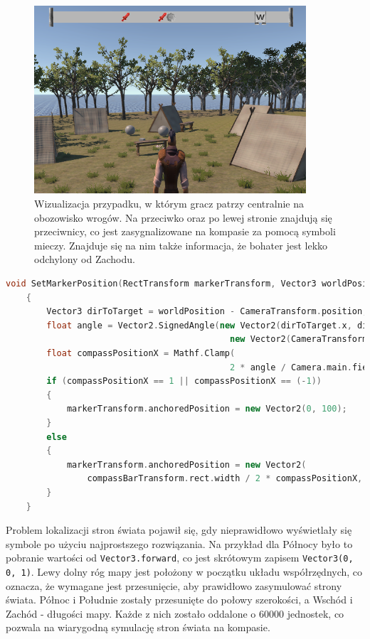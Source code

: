 \begin{figure}[htbp]
    \centering
    \includegraphics[width=0.9\textwidth]{images/ui/compass.png}
    \caption{Wizualizacja przypadku, w którym gracz patrzy centralnie na obozowisko wrogów. Na przeciwko oraz po lewej stronie znajdują się przeciwnicy, co jest zasygnalizowane na kompasie za pomocą symboli mieczy. Znajduje się na nim także informacja, że bohater jest lekko odchylony od Zachodu.
    }\label{fig:compass}
\end{figure}
\FloatBarrier
    \begin{lstlisting}[language=C++, caption=Fragment kodu odpowiedzialny za ustawienie symbolu na pasku kompasu.]
    void SetMarkerPosition(RectTransform markerTransform, Vector3 worldPosition)
    {
        Vector3 dirToTarget = worldPosition - CameraTransform.position;
        float angle = Vector2.SignedAngle(new Vector2(dirToTarget.x, dirToTarget.z), 
                                            new Vector2(CameraTransform.transform.forward.x, CameraTransform.transform.forward.z));
        float compassPositionX = Mathf.Clamp(
                                            2 * angle / Camera.main.fieldOfView, -1, 1);
        if (compassPositionX == 1 || compassPositionX == (-1))
        {
            markerTransform.anchoredPosition = new Vector2(0, 100);
        }
        else
        {
            markerTransform.anchoredPosition = new Vector2(
                compassBarTransform.rect.width / 2 * compassPositionX, 0);
        }
    }
    \end{lstlisting}
\FloatBarrier
Problem lokalizacji stron świata pojawił się, gdy nieprawidłowo wyświetlały się symbole po użyciu najprostszego rozwiązania. Na przykład dla Północy było to
pobranie wartości od \verb|Vector3.forward|, co jest skrótowym zapisem \verb|Vector3(0, 0, 1)|. Lewy dolny róg mapy jest położony w początku układu współrzędnych, co oznacza, że wymagane
jest przesunięcie, aby prawidłowo zasymulować strony świata. Północ i Południe  zostały przesunięte do połowy szerokości, a Wschód i Zachód - długości mapy. Każde z nich
zostało oddalone o 60000 jednostek, co pozwala na wiarygodną symulację stron świata na kompasie.

